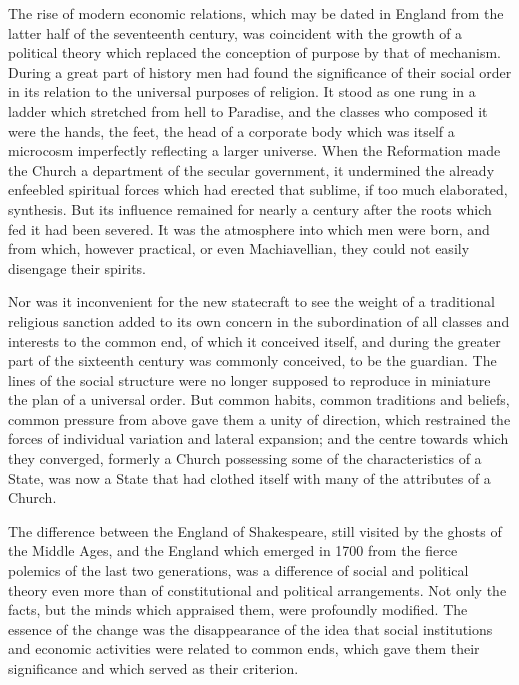\documentclass{book}
\begin{document}
The rise of modern economic relations, which may be dated in England from the latter half of the seventeenth century, was coincident with the growth of a political theory which replaced the conception of purpose by that of mechanism. During a great part of history men had found the significance of their social order in its relation to the universal purposes of religion. It stood as one rung in a ladder which stretched from hell to Paradise, and the classes who composed it were the hands, the feet, the head of a corporate body which was itself a microcosm imperfectly reflecting a larger universe. When the Reformation made the Church a department of the secular government, it undermined the already enfeebled spiritual forces which had erected that sublime, if too much elaborated, synthesis. But its influence remained for nearly a century after the roots which fed it had been severed. It was the atmosphere into which men were born, and from which, however practical, or even Machiavellian, they could not easily disengage their spirits.

Nor was it inconvenient for the new statecraft to see the weight of a traditional religious sanction added to its own concern in the subordination of all classes and interests to the common end, of which it conceived itself, and during the greater part of the sixteenth century was commonly conceived, to be the guardian. The lines of the social structure were no longer supposed to reproduce in miniature the plan of a universal order. But common habits, common traditions and beliefs, common pressure from above gave them a unity of direction, which restrained the forces of individual variation and lateral expansion; and the centre towards which they converged, formerly a Church possessing some of the characteristics of a State, was now a State that had clothed itself with many of the attributes of a Church.

The difference between the England of Shakespeare, still visited by the ghosts of the Middle Ages, and the England which emerged in 1700 from the fierce polemics of the last two generations, was a difference of social and political theory even more than of constitutional and political arrangements. Not only the facts, but the minds which appraised them, were profoundly modified. The essence of the change was the disappearance of the idea that social institutions and economic activities were related to common ends, which gave them their significance and which served as their criterion.
\end{document}
